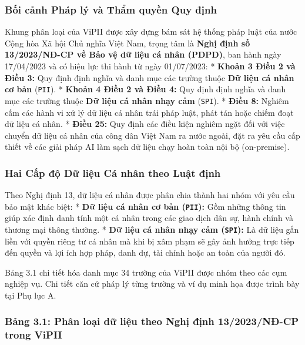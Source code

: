 \documentclass[
  11pt,
  a4paper,
]{article}
\begin{document}
\subsubsection{Bối cảnh Pháp lý và Thẩm quyền Quy
định}\label{bux1ed1i-cux1ea3nh-phuxe1p-luxfd-vuxe0-thux1ea9m-quyux1ec1n-quy-ux111ux1ecbnh}

Khung phân loại của ViPII được xây dựng bám sát hệ thống pháp luật của nước Cộng hòa Xã hội Chủ
nghĩa Việt Nam, trọng tâm là \textbf{Nghị định số 13/2023/NĐ-CP về Bảo vệ dữ liệu cá nhân (PDPD)},
ban hành ngày 17/04/2023 và có hiệu lực thi hành từ ngày 01/07/2023: * \textbf{Khoản 3 Điều 2 và
Điều 3:} Quy định định nghĩa và danh mục các trường thuộc \textbf{Dữ liệu cá nhân cơ bản}
(\texttt{PII}). * \textbf{Khoản 4 Điều 2 và Điều 4:} Quy định định nghĩa và danh mục các trường
thuộc \textbf{Dữ liệu cá nhân nhạy cảm} (\texttt{SPI}). * \textbf{Điều 8:} Nghiêm cấm các hành vi xử
lý dữ liệu cá nhân trái pháp luật, phát tán hoặc chiếm đoạt dữ liệu cá nhân. * \textbf{Điều 25:} Quy
định các điều kiện nghiêm ngặt đối với việc chuyển dữ liệu cá nhân của công dân Việt Nam ra nước
ngoài, đặt ra yêu cầu cấp thiết về các giải pháp AI làm sạch dữ liệu chạy hoàn toàn nội bộ
(on-premise).

\subsubsection{Hai Cấp độ Dữ liệu Cá nhân theo Luật
định}\label{hai-cux1ea5p-ux111ux1ed9-dux1eef-liux1ec7u-cuxe1-nhuxe2n-theo-luux1eadt-ux111ux1ecbnh}

Theo Nghị định 13, dữ liệu cá nhân được phân chia thành hai nhóm với yêu cầu bảo mật khác biệt: *
\textbf{Dữ liệu cá nhân cơ bản (\texttt{PII}):} Gồm những thông tin giúp xác định danh tính một cá
nhân trong các giao dịch dân sự, hành chính và thương mại thông thường. * \textbf{Dữ liệu cá nhân
nhạy cảm (\texttt{SPI}):} Là dữ liệu gắn liền với quyền riêng tư cá nhân mà khi bị xâm phạm sẽ gây
ảnh hưởng trực tiếp đến quyền và lợi ích hợp pháp, danh dự, tài chính hoặc an toàn của người đó.

Bảng 3.1 chi tiết hóa danh mục 34 trường của ViPII được nhóm theo các cụm nghiệp vụ. Chi tiết căn cứ
pháp lý từng trường và ví dụ minh họa được trình bày tại Phụ lục A.

\subsubsection{Bảng 3.1: Phân loại dữ liệu theo Nghị định 13/2023/NĐ-CP trong
ViPII}\label{bux1ea3ng-3.1-phuxe2n-loux1ea1i-dux1eef-liux1ec7u-theo-nghux1ecb-ux111ux1ecbnh-132023nux111-cp-trong-vipii}
\end{document}
